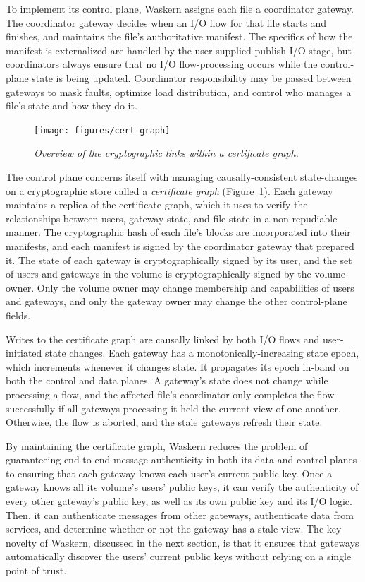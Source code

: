 To implement its control plane, Waskern assigns each file a coordinator
gateway. The coordinator gateway decides when an I/O flow for that file starts
and finishes, and maintains the file's authoritative manifest. The specifics
of how the manifest is externalized are handled by the user-supplied publish I/O
stage, but coordinators always ensure that no I/O flow-processing occurs while
the control-plane state is being updated. Coordinator responsibility may be
passed between gateways to mask faults, optimize load distribution, and control
who manages a file's state and how they do it.


\begin{figure}[t!]
\centering
\texttt{[image: figures/cert-graph]}
\caption{\it
Overview of the cryptographic links within a certificate graph.
   }
\label{fig:cert-graph}
\end{figure}


The control plane concerns itself with managing causally-consistent
state-changes on a cryptographic store called a \textit{certificate graph}
(Figure~\ref{fig:cert-graph}). Each gateway
maintains a replica of the certificate graph, which it uses to verify the
relationships between users, gateway state, and file state in a non-repudiable
manner. The cryptographic hash of each file's blocks are incorporated into
their manifests, and each manifest is signed by the coordinator gateway that
prepared it. The state of each gateway is cryptographically signed by its user,
and the set of users and gateways in the volume is cryptographically signed by
the volume owner. Only the volume owner may change membership and capabilities
of users and gateways, and only the gateway owner may change the other
control-plane fields.


Writes to the certificate graph are causally linked by both I/O flows and
user-initiated state changes. Each gateway has a monotonically-increasing state
epoch, which increments whenever it changes state. It propagates its epoch
in-band on both the control and data planes. A gateway's state does not
change while processing a flow, and the affected file's coordinator only
completes the flow successfully if all gateways processing it held the current
view of one another. Otherwise, the flow is aborted, and the stale gateways
refresh their state.


By maintaining the certificate graph, Waskern reduces the problem of
guaranteeing end-to-end message authenticity in both its data and control planes
to ensuring that each gateway knows each user's current public key. Once a
gateway knows all its volume's users' public keys, it can verify the
authenticity of every other gateway's public key, as well as its own public
key and its I/O logic. Then, it can authenticate messages from other gateways,
authenticate data from services, and determine whether or not the gateway has a
stale view. The key novelty of Waskern, discussed in the next section, is that
it ensures that gateways automatically discover the users' current public
keys without relying on a single point of trust.

